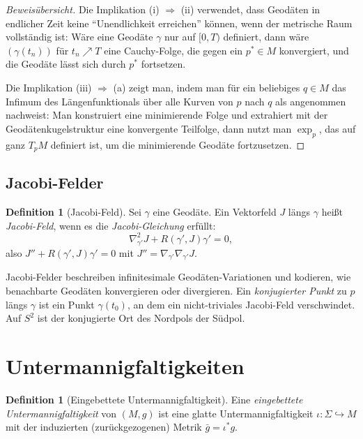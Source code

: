 \documentclass[12pt,a4paper]{amsart}
\theoremstyle{definition}
\newtheorem{definition}[theorem]{Definition}
\begin{document}
\begin{proof}[Beweisübersicht]
Die Implikation (i) $\Rightarrow$ (ii) verwendet, dass Geodäten in endlicher Zeit
keine ``Unendlichkeit erreichen'' können, wenn der metrische Raum vollständig ist:
Wäre eine Geodäte $\gamma$ nur auf $[0, T)$ definiert, dann wäre $(\gamma(t_n))$
für $t_n \nearrow T$ eine Cauchy-Folge, die gegen ein $p^* \in M$ konvergiert,
und die Geodäte lässt sich durch $p^*$ fortsetzen.

Die Implikation (iii) $\Rightarrow$ (a) zeigt man, indem man für ein beliebiges
$q \in M$ das Infimum des Längenfunktionals über alle Kurven von $p$ nach $q$
als angenommen nachweist: Man konstruiert eine minimierende Folge und extrahiert
mit der Geodätenkugelstruktur eine konvergente Teilfolge, dann nutzt man
$\exp_p$, das auf ganz $T_pM$ definiert ist, um die minimierende Geodäte
fortzusetzen.
\end{proof}

\subsection{Jacobi-Felder}

\begin{definition}[Jacobi-Feld]
Sei $\gamma$ eine Geodäte. Ein Vektorfeld $J$ längs $\gamma$ heißt
\emph{Jacobi-Feld}, wenn es die \emph{Jacobi-Gleichung} erfüllt:
\[
  \nabla^2_{\gamma'} J + R(\gamma', J)\gamma' = 0,
\]
also $J'' + R(\gamma', J)\gamma' = 0$ mit $J'' = \nabla_{\gamma'}\nabla_{\gamma'} J$.
\end{definition}

Jacobi-Felder beschreiben infinitesimale Geodäten-Variationen und kodieren,
wie benachbarte Geodäten konvergieren oder divergieren. Ein \emph{konjugierter
Punkt} zu $p$ längs $\gamma$ ist ein Punkt $\gamma(t_0)$, an dem ein
nicht-triviales Jacobi-Feld verschwindet. Auf $S^2$ ist der konjugierte
Ort des Nordpols der Südpol.

\section{Untermannigfaltigkeiten}
\label{sec:untermannigfaltigkeiten}

\begin{definition}[Eingebettete Untermannigfaltigkeit]
Eine \emph{eingebettete Untermannigfaltigkeit} von $(M, g)$ ist eine glatte
Untermannigfaltigkeit $\iota: \Sigma \hookrightarrow M$ mit der induzierten
(zurückgezogenen) Metrik $\bar{g} = \iota^* g$.
\end{definition}
\end{document}
